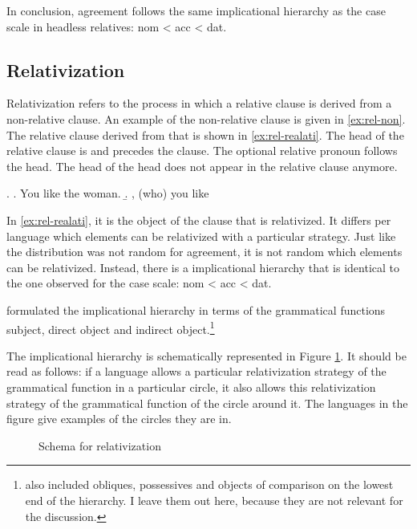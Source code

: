 In conclusion, agreement follows the same implicational hierarchy as the case scale in headless relatives: \ac{nom} < \ac{acc} < \ac{dat}.


\subsection{Relativization}

Relativization refers to the process in which a relative clause is derived from a non-relative clause. An example of the non-relative clause is given in \ref{ex:rel-non}. The relative clause derived from that is shown in \ref{ex:rel-realati}. The head of the relative clause is  and precedes the clause. The optional relative pronoun follows the head. The head of the head does not appear in the relative clause anymore.

\ex.
\a. You like the woman. \label{ex:rel-non}
\b.  , (who) you like \label{ex:rel-realati}

In \ref{ex:rel-realati}, it is the object of the clause that is relativized. It differs per language which elements can be relativized with a particular strategy. Just like the distribution was not random for agreement, it is not random which elements can be relativized. Instead, there is a implicational hierarchy that is identical to the one observed for the case scale: \ac{nom} < \ac{acc} < \ac{dat}.

\citet{keenan1977} formulated the implicational hierarchy in terms of the grammatical functions subject, direct object and indirect object.\footnote{
\citet{keenan1977} also included obliques, possessives and objects of comparison on the lowest end of the hierarchy. I leave them out here, because they are not relevant for the discussion.
}

The implicational hierarchy is schematically represented in Figure \ref{fig:relativization}. It should be read as follows: if a language allows a particular relativization strategy of the grammatical function in a particular circle, it also allows this relativization strategy of the grammatical function of the circle around it. The languages in the figure give examples of the circles they are in.

\begin{figure}[H]
  \centering
  \caption{Schema for relativization}
  \label{fig:relativization}
\end{figure}

